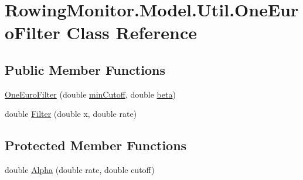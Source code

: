 \hypertarget{class_rowing_monitor_1_1_model_1_1_util_1_1_one_euro_filter}{}\section{Rowing\+Monitor.\+Model.\+Util.\+One\+Euro\+Filter Class Reference}
\label{class_rowing_monitor_1_1_model_1_1_util_1_1_one_euro_filter}
\subsection*{Public Member Functions}
\begin{DoxyCompactItemize}
\item 
\hyperlink{class_rowing_monitor_1_1_model_1_1_util_1_1_one_euro_filter_a945b190ec38aa5a4fd9d440800becda5}{One\+Euro\+Filter} (double \hyperlink{class_rowing_monitor_1_1_model_1_1_util_1_1_one_euro_filter_a54c70fc75d1de35642fc30ef4ef78782}{min\+Cutoff}, double \hyperlink{class_rowing_monitor_1_1_model_1_1_util_1_1_one_euro_filter_a11b6badcd4065baa9453aa4672300fb3}{beta})
\item 
double \hyperlink{class_rowing_monitor_1_1_model_1_1_util_1_1_one_euro_filter_a4c0409d8b95c07c2b6dd4567fb438532}{Filter} (double x, double rate)
\end{DoxyCompactItemize}
\subsection*{Protected Member Functions}
\begin{DoxyCompactItemize}
\item 
double \hyperlink{class_rowing_monitor_1_1_model_1_1_util_1_1_one_euro_filter_abc822a48fcbff3daad7bbf5b9d056c8e}{Alpha} (double rate, double cutoff)
\end{DoxyCompactItemize}
